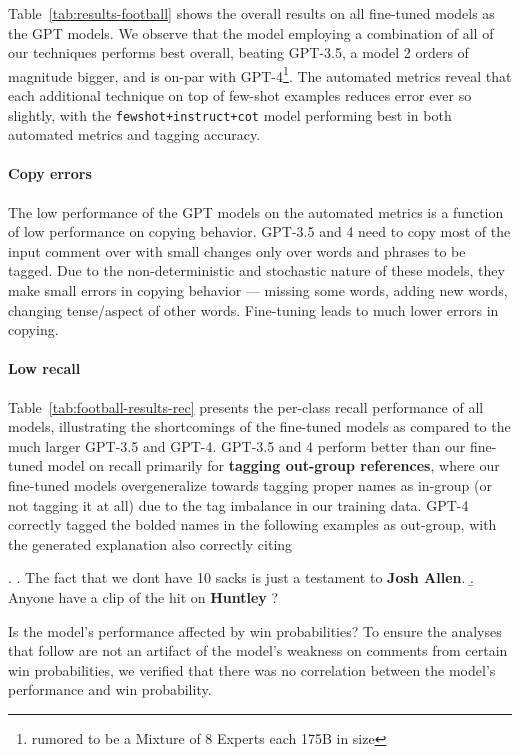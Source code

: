 

Table~\ref{tab:results-football} shows the overall results on all fine-tuned models as the GPT models. We observe that the model employing a combination of all of our techniques performs best overall, beating GPT-3.5, a model 2 orders of magnitude bigger, and is on-par with GPT-4\footnote{rumored to be a Mixture of 8 Experts each 175B in size}. The automated metrics reveal that each additional technique on top of few-shot examples reduces error ever so slightly, with the \texttt{fewshot+instruct+cot} model performing best in both automated metrics and tagging accuracy.

\paragraph{Copy errors} The low performance of the GPT models on the automated metrics is a function of low performance on copying behavior. GPT-3.5 and 4 need to copy most of the input comment over with small changes only over words and phrases to be tagged. Due to the non-deterministic and stochastic nature of these models, they make small errors in copying behavior --- missing some words, adding new words, changing tense/aspect of other words. Fine-tuning leads to much lower errors in copying.

\paragraph{Low recall} Table~\ref{tab:football-results-rec} presents the per-class recall performance of all models, illustrating the shortcomings of the fine-tuned models as compared to the much larger GPT-3.5 and GPT-4. GPT-3.5 and 4 perform better than our fine-tuned model on recall primarily for \textbf{tagging out-group references}, where our fine-tuned models overgeneralize towards tagging proper names as in-group (or not tagging it at all) due to the tag imbalance in our training data. GPT-4 correctly tagged the bolded names in the following examples as out-group, with the generated explanation also correctly citing 

\ex. \a. The fact that we dont have 10 sacks is just a testament to \textbf{Josh Allen}.
     \b. Anyone have a clip of the hit on \textbf{Huntley} ?



Is the model's performance affected by win probabilities? To ensure the analyses that follow are not an artifact of the model's weakness on comments from certain win probabilities, we verified that there was no correlation between the model's performance and win probability.

